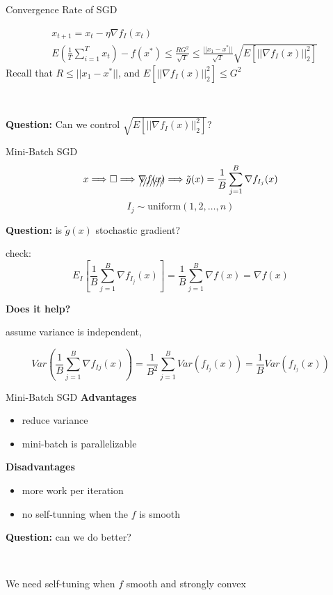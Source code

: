 \documentclass[aspectratio=169,xcolor=dvipsnames]{beamer}
\begin{document}

\begin{frame}{Convergence Rate of SGD}

\begin{align*}
	&x_{t+1} = x_t - \eta \nabla f_I(x_t) \\
	&E(\frac{1}{T}\sum_{i=1}^T x_t ) - f(x^*) \le \frac{RG^2}{\sqrt{T}} \le \frac{||x_1 - x^*||}{\sqrt T} \sqrt{E[||\nabla f_I(x)||_2^2]}
\end{align*}
\quad \quad \quad \quad \quad \quad \quad  Recall that $R \le ||x_1 - x^*||$, and $E[||\nabla f_I(x)||_2^2] \le G^2$

\

\begin{center}
	\pause \textbf{Question:} Can we control $\sqrt{E[||\nabla f_I(x)||_2^2]}$?
\end{center}

	
\end{frame}


\begin{frame}{Mini-Batch SGD}
\begin{align*}
	x \Longrightarrow \Box \Longrightarrow \xout{\nabla f(x)} \Longrightarrow \tilde g(x) = \frac{1}{B}\sum_{j = 1}^B \nabla f_{I_j}(x)
\end{align*}
$$I_j \sim \text{uniform}(1, 2, \ldots, n)$$

\textbf{Question:} is $\tilde g(x)$ stochastic gradient?

\pause check: $$E_I[\frac{1}{B} \sum_{j=1}^B\nabla f_{I_j}(x)] = \frac{1}{B}\sum_{j = 1}^B \nabla f(x) = \nabla f(x)$$

\textbf{Does it help?}

assume variance is independent,

$$Var(\frac{1}{B}\sum_{j=1}^B \nabla f_{Ij}(x)) = \frac{1}{B^2}\sum_{j=1}^B Var(f_{I_j}(x)) = \frac{1}{B}Var(f_{I_j}(x))$$

\end{frame}


\begin{frame}{Mini-Batch SGD}
\textbf{Advantages}
\begin{itemize}
	\item reduce variance
	\item mini-batch is parallelizable
\end{itemize}


\textbf{Disadvantages}

\begin{itemize}
	\item more work per iteration
	\item no self-tunning when the $f$ is smooth
\end{itemize}

\pause \textbf{Question:} can we do better?

\

\pause We need self-tuning when $f$ smooth and strongly convex

\end{frame}
\end{document}
